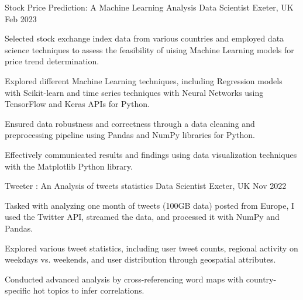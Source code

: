   
\begin{cventries}
  \cventry
  {Stock Price Prediction: A Machine Learning Analysis} %
  {Data Scientist} %
  {Exeter, UK} %
  {Feb 2023} %
  {
    \begin{cvitems} %
      \item {Selected stock exchange index data from various countries and employed data science techniques to assess the feasibility of uising Machine Learning models for price trend determination.}
      \item{Explored different Machine Learning techniques, including Regression models with Scikit-learn and time series techniques with Neural Networks using TensorFlow and Keras APIs for Python.}
      \item{Ensured data robustness and correctness through a data cleaning and preprocessing pipeline using Pandas and NumPy libraries for Python.}
      \item{Effectively communicated results and findings using data visualization techniques with the Matplotlib Python library.}
    \end{cvitems}
  }%
  \cventry
  {Tweeter : An Analysis of tweets statistics}
  {Data Scientist}
  {Exeter, UK}
  {Nov 2022}
  {
    \begin{cvitems}
      \item {Tasked with analyzing one month of tweets (100GB data) posted from Europe, I used the Twitter API, streamed the data, and processed it with NumPy and Pandas.}
      \item{Explored various tweet statistics, including user tweet counts, regional activity on weekdays vs. weekends, and user distribution through geospatial attributes.}
      \item{Conducted advanced analysis by cross-referencing word maps with country-specific hot topics to infer correlations.}

\end{cvitems}}
\end{cventries}
